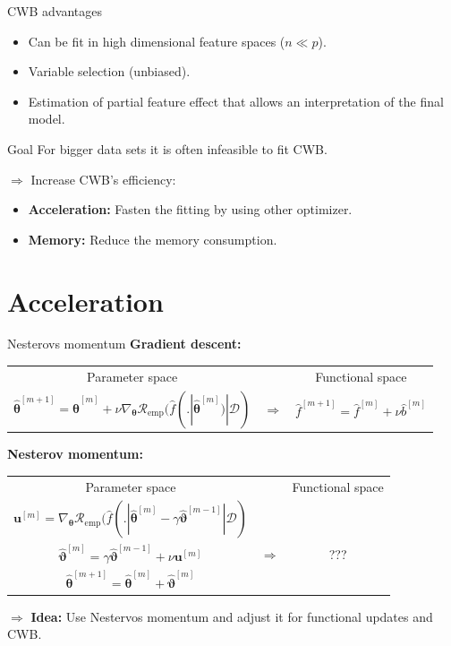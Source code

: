 \documentclass[ignorenonframetext,]{beamer}
\providecommand{\tightlist}{%
  \setlength{\itemsep}{0pt}\setlength{\parskip}{0pt}}
\newcommand{\D}{\mathcal{D}}
\newcommand{\fh}{\hat{f}}
\newcommand{\fmh}{\fh^{[m]}}
\newcommand{\tb}{\bm{\theta}}
\newcommand{\tbh}{\hat{\bm{\theta}}}
\newcommand{\riske}{\mathcal{R}_{\text{emp}}}
\begin{document}
\begin{frame}{CWB advantages}
\protect\hypertarget{cwb-advantages}{}
\begin{itemize}
\tightlist
\item
  Can be fit in high dimensional feature spaces (\(n \ll p\)).
\item
  Variable selection (unbiased).
\item
  Estimation of partial feature effect that allows an interpretation of
  the final model.
\end{itemize}
\end{frame}

\begin{frame}{Goal}
\protect\hypertarget{goal}{}
For bigger data sets it is often infeasible to fit CWB.

\(\Rightarrow\) Increase CWB's efficiency:

\begin{itemize}
\tightlist
\item
  \textbf{Acceleration:} Fasten the fitting by using other optimizer.
\item
  \textbf{Memory:} Reduce the memory consumption.
\end{itemize}
\end{frame}

\hypertarget{acceleration}{%
\section{Acceleration}\label{acceleration}}

\begin{frame}{Nesterovs momentum}
\protect\hypertarget{nesterovs-momentum}{}
\textbf{Gradient descent:}

\vspace{0.2cm}
{\small
\begin{tabular}{ccc}
  Parameter space & & Functional space \\[0.3cm]
  $\tbh^{[m+1]} = \tbh^{[m]} + \nu \nabla_{\tb}\riske(\fh(. | \tbh^{[m]}) | \D)$ & $\Rightarrow$ & $\fh^{[m+1]} = \fmh + \nu \hat{b}^{[m]}$
\end{tabular}}
\vspace{0.2cm}

\textbf{Nesterov momentum:}

\vspace{0.2cm}
{\small
\begin{tabular}{ccc}
  Parameter space & & Functional space \\[0.3cm]
  $\bm{u}^{[m]} = \nabla_{\tb}\riske(\fh(. | \tbh^{[m]} - \gamma \hat{\bm{\vartheta}}^{[m-1]} | \D)$ &  & \\
  $\hat{\bm{\vartheta}}^{[m]} = \gamma \hat{\bm{\vartheta}}^{[m-1]} + \nu \bm{u}^{[m]}$ & $\Rightarrow$ & ??? \\
  $\tbh^{[m+1]} = \tbh^{[m]} + \hat{\bm{\vartheta}}^{[m]}$ & &
\end{tabular}}
\vspace{0.2cm}

\(\Rightarrow\) \textbf{Idea:} Use Nestervos momentum and adjust it for
functional updates and CWB.
\end{frame}
\end{document}
